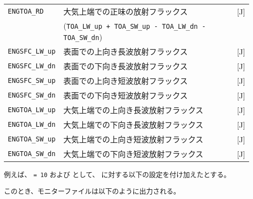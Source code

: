 \begin{table}[h]
\begin{center}
\begin{tabularx}{150mm}{|l|X|l|}
      \verb|ENGTOA_RD|    & 大気上端での正味の放射フラックス      & [J] \\
                          & (\verb|TOA_LW_up + TOA_SW_up - TOA_LW_dn - TOA_SW_dn|) & \\
      \verb|ENGSFC_LW_up| & 表面での上向き長波放射フラックス           & [J] \\
      \verb|ENGSFC_LW_dn| & 表面での下向き長波放射フラックス           & [J] \\
      \verb|ENGSFC_SW_up| & 表面での上向き短波放射フラックス           & [J] \\
      \verb|ENGSFC_SW_dn| & 表面での下向き短波放射フラックス           & [J] \\
      \verb|ENGTOA_LW_up| & 大気上端での上向き長波放射フラックス & [J] \\
      \verb|ENGTOA_LW_dn| & 大気上端での下向き長波放射フラックス & [J] \\
      \verb|ENGTOA_SW_up| & 大気上端での上向き短波放射フラックス & [J] \\
      \verb|ENGTOA_SW_dn| & 大気上端での下向き短波放射フラックス & [J] \\
    \hline
  \end{tabularx}
\end{center}
\end{table}

例えば、  \verb|= 10| および として、
に対する以下の設定を付け加えたとする。


\noindent
このとき、モニターファイルは以下のように出力される。


